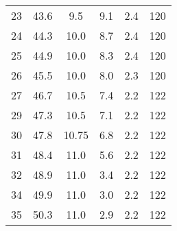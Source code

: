 \begin{table}
\begin{tabular}{S[table-format = 2.0] S[table-format = 2.1] S[table-format = 2.2] S[table-format = 2.1] S[table-format = 1.1] S[table-format = 3.0]}
            23 &	43.6 &	 9.5  &  9.1 &  2.4	 &  120 \\
            24 &	44.3 &	10.0  &	 8.7 &  2.4	 &  120 \\
            25 &	44.9 &	10.0  &	 8.3 &  2.4	 &  120 \\ 
            26 &	45.5 &	10.0  &	 8.0 &  2.3	 &  120 \\
            27 &	46.7 &	10.5  &	 7.4 &  2.2	 &  122 \\
            29 &	47.3 &	10.5  &	 7.1 &  2.2	 &  122 \\
            30 &	47.8 &	10.75 &	 6.8 &  2.2  &	122 \\
            31 &	48.4 &	11.0  &	 5.6 &  2.2	 &  122 \\
            32 &	48.9 &	11.0  &	 3.4 &  2.2	 &  122 \\ 
            34 &	49.9 &	11.0  &	 3.0 &  2.2	 &  122 \\
            35 &	50.3 &	11.0  &	 2.9 &  2.2  &	122 \\
            \bottomrule
        \end{tabular}
    \end{table}


